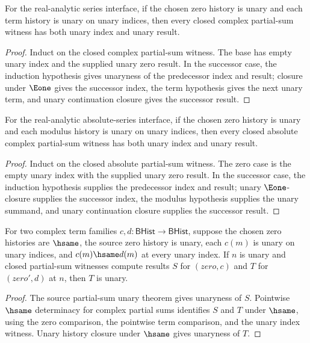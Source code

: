 \begin{theorem}
\label{thm:real-analytic-complex-part-sum-index-result-unary}
For the real-analytic series interface, if the chosen zero history is unary and
each term history is unary on unary indices, then every closed complex
partial-sum witness has both unary index and unary result.
\end{theorem}
\begin{proof}
Induct on the closed complex partial-sum witness. The base has empty unary
index and the supplied unary zero result. In the successor case, the induction
hypothesis gives unaryness of the predecessor index and result; closure under
\(\Eone\) gives the successor index, the term hypothesis gives the next unary
term, and unary continuation closure gives the successor result.
\end{proof}

\begin{theorem}
\label{thm:real-analytic-complex-abs-part-sum-index-result-unary}
For the real-analytic absolute-series interface, if the chosen zero history is
unary and each modulus history is unary on unary indices, then every closed
absolute complex partial-sum witness has both unary index and unary result.
\end{theorem}
\begin{proof}
Induct on the closed absolute partial-sum witness. The zero case is the empty
unary index with the supplied unary zero result. In the successor case, the
induction hypothesis supplies the predecessor index and result; unary
\(\Eone\)-closure supplies the successor index, the modulus hypothesis supplies
the unary summand, and unary continuation closure supplies the successor
result.
\end{proof}

\begin{theorem}
\label{thm:real-analytic-complex-part-sum-pointwise-result-unary-transport}
For two complex term families $c,d:\mathsf{BHist}\to\mathsf{BHist}$, suppose
the chosen zero histories are $\hsame$, the source zero history is unary, each
$c(m)$ is unary on unary indices, and $c(m)\hsame d(m)$ at every unary index.
If $n$ is unary and closed partial-sum witnesses compute results $S$ for
$(zero,c)$ and $T$ for $(zero',d)$ at $n$, then $T$ is unary.
\end{theorem}
\begin{proof}
The source partial-sum unary theorem gives unaryness of $S$. Pointwise
$\hsame$ determinacy for complex partial sums identifies $S$ and $T$ under
$\hsame$, using the zero comparison, the pointwise term comparison, and the
unary index witness. Unary history closure under $\hsame$ gives unaryness of
$T$.
\end{proof}


